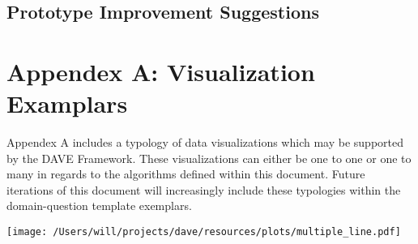 \documentclass{article}
\begin{document}
\subsection{Prototype Improvement Suggestions}

\section{Appendex A: Visualization Examplars}
Appendex A includes a typology of data visualizations which may be supported by the DAVE Framework.
These visualizations can either be one to one or one to many in regards to the algorithms defined within this document.
Future iterations of this document will increasingly include these typologies within the domain-question template exemplars.

\begin{figure*}[h]
  \centering
  \begin{floatrow}[3]
    {}
      {}
    \end{floatrow}
\end{figure*}

\begin{figure*}[h]
  \centering
  \begin{floatrow}[3]
    {}
  {\texttt{[image: /Users/will/projects/dave/resources/plots/multiple\_line.pdf]}}
  \end{floatrow}
\end{figure*}
\end{document}
